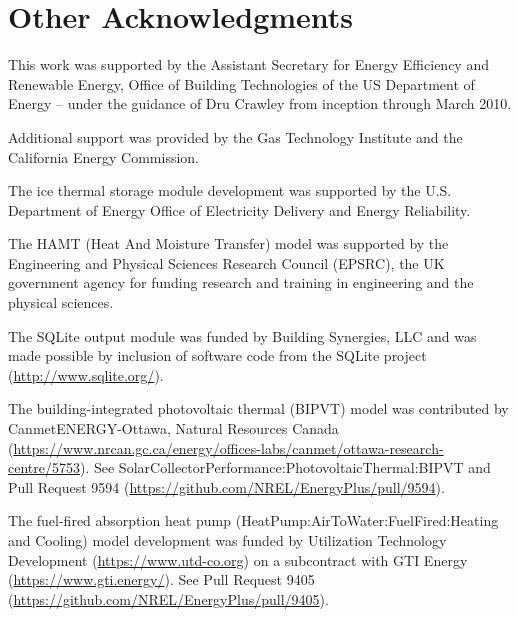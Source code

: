 \section{Other Acknowledgments}\label{other-acknowledgments}

This work was supported by the Assistant Secretary for Energy Efficiency and Renewable Energy, Office of Building Technologies of the US Department of Energy -- under the guidance of Dru Crawley from inception through March 2010.

Additional support was provided by the Gas Technology Institute and the California Energy Commission.

The ice thermal storage module development was supported by the U.S. Department of Energy Office of Electricity Delivery and Energy Reliability.

The HAMT (Heat And Moisture Transfer) model was supported by the Engineering and Physical Sciences Research Council (EPSRC), the UK government agency for funding research and training in engineering and the physical sciences.

The SQLite output module was funded by Building Synergies, LLC and was made possible by inclusion of software code from the SQLite project (\url{http://www.sqlite.org/}).

The building-integrated photovoltaic thermal (BIPVT) model was contributed by CanmetENERGY-Ottawa, Natural Resources Canada (\url{https://www.nrcan.gc.ca/energy/offices-labs/canmet/ottawa-research-centre/5753}). See SolarCollectorPerformance:PhotovoltaicThermal:BIPVT and Pull Request 9594 (\url{https://github.com/NREL/EnergyPlus/pull/9594}).

The fuel-fired absorption heat pump (HeatPump:AirToWater:FuelFired:Heating and Cooling) model development was funded by Utilization Technology Development (\url{https://www.utd-co.org}) on a subcontract with GTI Energy (\url{https://www.gti.energy/}). See Pull Request 9405 (\url{https://github.com/NREL/EnergyPlus/pull/9405}).
